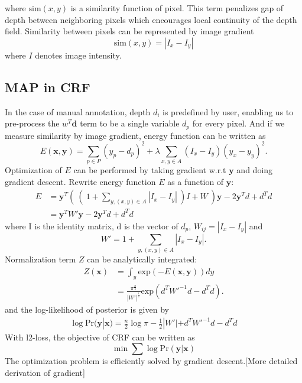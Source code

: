 \documentclass[10pt,twocolumn,letterpaper]{article}
\begin{document}
where $\text{sim}(x, y)$ is a similarity function of pixel. This term penalizes gap of depth between neighboring pixels which encourages local continuity of the depth field.
Similarity between pixels can be represented by image gradient
\begin{equation}
\text{sim}(x, y) = |I_x-I_y|
\end{equation}
where $I$ denotes image intensity.
\subsection{MAP in CRF}
In the case of manual annotation, depth $d_i$ is predefined by user, enabling us to pre-process the $w^T\mathbf{d}$ term to be a single variable $d_p$ for every pixel. And if we measure similarity by image gradient, energy function can be written as
\begin{equation}
E(\mathbf{x}, \mathbf{y}) = \sum_{p \in P} (y_p-d_p)^2 + \lambda \sum_{x, y \in A}(I_x-I_y)(y_x-y_y)^2.
\end{equation}
Optimization of $E$ can be performed by taking gradient w.r.t $\mathbf{y}$ and doing gradient descent. Rewrite energy function $E$ as a function of $\mathbf{y}$:
\begin{align}
E &= \mathbf{y}^T (\ (\ 1+\sum_{y, (x, y)\in A}|I_x-I_y|\ )I+W\ )\mathbf{y}-2\mathbf{y}^Td+d^Td 
\\ &= \mathbf{y}^T W'\mathbf{y}-2\mathbf{y}^Td+d^Td 
\end{align}
where I is the identity matrix, d is the vector of $d_p$, $W_{ij} = |I_x-I_y| $ and 
\begin{equation}
W' = 1+\sum_{y, (x, y)\in A}|I_x-I_y|.
\end{equation}
Normalization term $Z$ can be analytically integrated:
\begin{align}
Z(\mathbf{x}) &= \int_y \text{exp}(-E(\mathbf{x}, \mathbf{y})) dy
\\ &= \frac{\pi ^{\frac{n}{2}}}{|W'|^{\frac{1}{2}}}\text{exp}(d^TW'^{-1}d-d^Td).
\end{align}
and the log-likelihood of posterior is given by
\begin{align}
\log \text{Pr}(\mathbf{y}|\mathbf{x}) = \frac{n}{2}\log \pi - \frac{1}{2}|W'|+d^TW'^{-1}d-d^Td
\end{align}
With l2-loss, the objective of CRF can be written as
\begin{equation}
\min \sum \log \text{Pr}(\mathbf{y}| \mathbf{x})
\end{equation}
The optimization problem is efficiently solved by gradient descent.[More detailed derivation of gradient]
\end{document}
